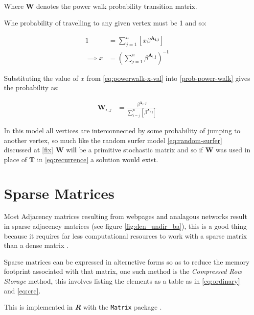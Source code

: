 \documentclass[11pt]{article}
\begin{document}
Where \(\mathbf{W}\) denotes the power walk probability transition matrix.

Whe probability of travelling to any given vertex must be 1 and so:


\begin{align}
      1 &= \sum^{n}_{j= 1}   \left[ x \beta^{\mathbf{A_{i,j}}} \right] \\
       \implies  x&= \left( \sum^{n}_{j= 1}   \beta^{\mathbf{A_{i,j}}}
       \right)^{-1} \label{eq:powerwalk-x-val}
\end{align}

Substituting the value of \(x\) from \eqref{eq:powerwalk-x-val} into \eqref{prob-power-walk} gives the probability as:

\begin{align}
      \mathbf{W}_{i,j} &= \frac{\beta^{\mathbf{A}__i,j}}{\sum^{n}_{i=j}
      \left[ \beta^{\mathbf{A}_{i,j}} \right] }
\end{align}

In this model all vertices are interconnected by some probability of jumping to
another vertex, so much like the random surfer model \eqref{eq:random-surfer} discussed
at \ref{fix} \(\mathbf{W}\) will be a primitive stochastic matrix and so if
\(\mathbf{W}\) was used in place of \(\mathbf{T}\) in \eqref{eq:recurrence} a solution
would exist.

\section{Sparse Matrices}
\label{sparse-matrix}
Most Adjacency matrices resulting from webpages and analagous networks
result in sparse adjacency matrices (see figure \ref{fig:den_undir_ba}),
this is a good thing because it requires far less computational
resources to work with a sparse matrix than a dense matrix
 \cite[]{langvilleGooglePageRankScience2012} .

Sparse matrices can be expressed in alternetive forms so as to reduce the memory
footprint associated with that matrix, one such method is the \emph{Compressed Row Storage} method, this involves listing the elements as a table as in \eqref{eq:ordinary} and \eqref{eq:crc}.

This is implemented in \textbf{\emph{R}} with the \texttt{Matrix} package
\cite{batesMatrixSparseDense2019a} .
\end{document}

